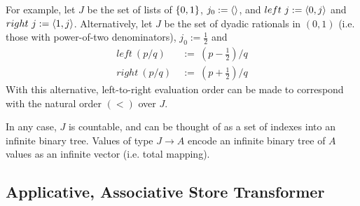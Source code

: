 For example, let $J$ be the set of lists of $\{{0,1}\}$, $j_0 := \langle{}\rangle$, and $left~j := \langle{0,j}\rangle$ and $right~j := \langle{1,j}\rangle$.
Alternatively, let $J$ be the set of dyadic rationals in $(0,1)$ (i.e. those with power-of-two denominators), $j_0 := \tfrac{1}{2}$ and
\begin{equation}
\begin{aligned}
	left~(p/q) &\ := \ (p-\tfrac{1}{2})/q
\\
	right~(p/q) &\ := \ (p+\tfrac{1}{2})/q
\end{aligned}
\end{equation}
With this alternative, left-to-right evaluation order can be made to correspond with the natural order $(<)$ over $J$.

In any case, $J$ is countable, and can be thought of as a set of indexes into an infinite binary tree.
Values of type $J \to A$ encode an infinite binary tree of $A$ values as an infinite vector (i.e. total mapping).

\subsection{Applicative, Associative Store Transformer}

